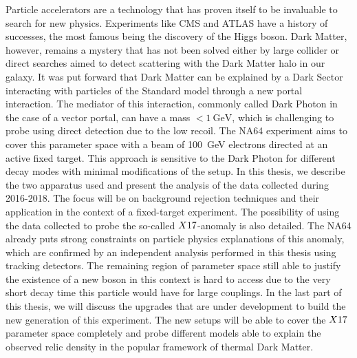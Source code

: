 Particle accelerators are a technology that has proven itself to be invaluable to search for new physics. Experiments like CMS and ATLAS have a history of successes, the most famous being the discovery of the Higgs boson. Dark Matter, however, remains a mystery that has not been solved either by large collider or direct searches aimed to detect scattering with the Dark Matter halo in our galaxy.  It was put forward that Dark Matter can be explained by a Dark Sector interacting with particles of the Standard model through a new portal interaction. The mediator of this interaction, commonly called Dark Photon in the case of a vector portal, can have a mass $< \SI{1}{\giga\electronvolt}$, which is challenging to probe using direct detection due to the low recoil. The NA64 experiment aims to cover this parameter space with a beam of \SI{100}{\giga\electronvolt} electrons directed at an active fixed target. This approach is sensitive to the Dark Photon for different decay modes with minimal modifications of the setup. In this thesis, we describe the two apparatus used and present the analysis of the data collected during 2016-2018. The focus will be on background rejection techniques and their application in the context of a fixed-target experiment. The possibility of using the data collected to probe the so-called $X17$-anomaly is also detailed. The NA64 already puts strong constraints on particle physics explanations of this anomaly, which are confirmed by an independent analysis performed in this thesis using tracking detectors. The remaining region of parameter space still able to justify the existence of a new boson in this context is hard to access due to the very short decay time this particle would have for large couplings. In the last part of this thesis, we will discuss the upgrades that are under development to build the new generation of this experiment. The new setups will be able to cover the $X17$ parameter space completely and probe different models able to explain the observed relic density in the popular framework of thermal Dark Matter.
